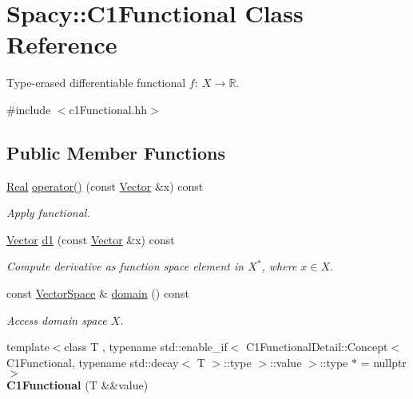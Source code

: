 \hypertarget{classSpacy_1_1C1Functional}{\section{\-Spacy\-:\-:\-C1\-Functional \-Class \-Reference}
\label{classSpacy_1_1C1Functional}
}


\-Type-\/erased differentiable functional $f:\ X \to \mathbb{R} $.  




{\ttfamily \#include $<$c1\-Functional.\-hh$>$}

\subsection*{\-Public \-Member \-Functions}
\begin{DoxyCompactItemize}
\item 
\hypertarget{classSpacy_1_1C1Functional_a621b710f0c8c583d074f4bf4da3cbb09}{\hyperlink{classSpacy_1_1Real}{\-Real} \hyperlink{classSpacy_1_1C1Functional_a621b710f0c8c583d074f4bf4da3cbb09}{operator()} (const \hyperlink{classSpacy_1_1Vector}{\-Vector} \&x) const }\label{classSpacy_1_1C1Functional_a621b710f0c8c583d074f4bf4da3cbb09}

\begin{DoxyCompactList}\small\item\em \-Apply functional. \end{DoxyCompactList}\item 
\hypertarget{classSpacy_1_1C1Functional_a5953291c58bf20e87ab2bfe26231fe49}{\hyperlink{classSpacy_1_1Vector}{\-Vector} \hyperlink{classSpacy_1_1C1Functional_a5953291c58bf20e87ab2bfe26231fe49}{d1} (const \hyperlink{classSpacy_1_1Vector}{\-Vector} \&x) const }\label{classSpacy_1_1C1Functional_a5953291c58bf20e87ab2bfe26231fe49}

\begin{DoxyCompactList}\small\item\em \-Compute derivative as function space element in $X^*$, where $x\in X$. \end{DoxyCompactList}\item 
\hypertarget{classSpacy_1_1C1Functional_a3ec8df7e7998b557445c907cbd8e80b8}{const \hyperlink{classSpacy_1_1VectorSpace}{\-Vector\-Space} \& \hyperlink{classSpacy_1_1C1Functional_a3ec8df7e7998b557445c907cbd8e80b8}{domain} () const }\label{classSpacy_1_1C1Functional_a3ec8df7e7998b557445c907cbd8e80b8}

\begin{DoxyCompactList}\small\item\em \-Access domain space $X$. \end{DoxyCompactList}\item 
\hypertarget{classSpacy_1_1C1Functional_ada8999210df700c93ee7d7c35bdabebc}{{\footnotesize template$<$class T , typename std\-::enable\-\_\-if$<$ C1\-Functional\-Detail\-::\-Concept$<$ C1\-Functional, typename std\-::decay$<$ T $>$\-::type $>$\-::value $>$\-::type $\ast$  = nullptr$>$ }\\{\bfseries \-C1\-Functional} (\-T \&\&value)}\label{classSpacy_1_1C1Functional_ada8999210df700c93ee7d7c35bdabebc}


\end{DoxyCompactItemize}
